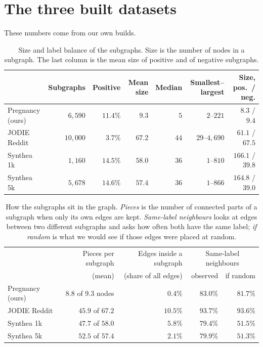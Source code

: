 \documentclass[11pt]{article}
\begin{document}
\section*{The three built datasets}

These numbers come from our own builds.

\begin{table}[H]
\centering
\small
\begin{tabular}{lrrrrrr}
\toprule
 & Subgraphs & Positive & Mean size & Median & Smallest--largest & Size, pos.\ / neg. \\
\midrule
Pregnancy (ours) & $6{,}590$ & $11.4\%$ & $9.3$ & $5$ & $2$--$221$ & $8.3$ / $9.4$ \\
JODIE Reddit & $10{,}000$ & $3.7\%$ & $67.2$ & $44$ & $29$--$4{,}690$ & $61.1$ / $67.5$ \\
Synthea 1k & $1{,}160$ & $14.5\%$ & $58.0$ & $36$ & $1$--$810$ & $\mathbf{166.1}$ / $39.8$ \\
Synthea 5k & $5{,}678$ & $14.6\%$ & $57.4$ & $36$ & $1$--$866$ & $\mathbf{164.8}$ / $39.0$ \\
\bottomrule
\end{tabular}
\caption{Size and label balance of the subgraphs. Size is the number of nodes in a subgraph.
The last column is the mean size of positive and of negative subgraphs.}
\end{table}

\begin{table}[H]
\centering
\small
\begin{tabular}{lrrrr}
\toprule
 & Pieces per subgraph & Edges inside a subgraph & \multicolumn{2}{c}{Same-label neighbours} \\
 & (mean) & (share of all edges) & observed & if random \\
\midrule
Pregnancy (ours) & $8.8$ of $9.3$ nodes & $0.4\%$ & $83.0\%$ & $81.7\%$ \\
JODIE Reddit & $45.9$ of $67.2$ & $10.5\%$ & $93.7\%$ & $93.6\%$ \\
Synthea 1k & $47.7$ of $58.0$ & $5.8\%$ & $79.4\%$ & $51.5\%$ \\
Synthea 5k & $52.5$ of $57.4$ & $2.1\%$ & $79.9\%$ & $51.3\%$ \\
\bottomrule
\end{tabular}
\caption{How the subgraphs sit in the graph. \emph{Pieces} is the number of connected parts of a
subgraph when only its own edges are kept. \emph{Same-label neighbours} looks at edges between
two different subgraphs and asks how often both have the same label; \emph{if random} is what
we would see if those edges were placed at random.}
\end{table}
\end{document}
